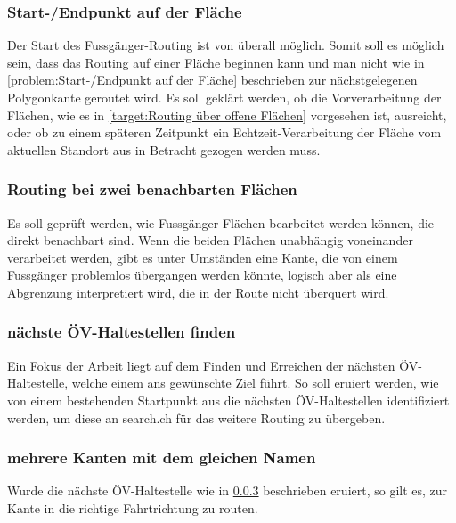 \subsubsection{Start-/Endpunkt auf der Fläche}
\label{target:Start-/Endpunkt auf der Fläche}
Der Start des Fussgänger-Routing ist von überall möglich. Somit soll es möglich sein, dass das Routing auf einer Fläche beginnen kann und man nicht wie in \ref{problem:Start-/Endpunkt auf der Fläche} beschrieben zur nächstgelegenen Polygonkante geroutet wird. Es soll geklärt werden, ob die Vorverarbeitung der Flächen, wie es in \ref{target:Routing über offene Flächen} vorgesehen ist, ausreicht, oder ob zu einem späteren Zeitpunkt ein Echtzeit-Verarbeitung der Fläche vom aktuellen Standort aus in Betracht gezogen werden muss.

\subsubsection{Routing bei zwei benachbarten Flächen}
\label{target:Routing bei zwei benachbarten Flächen}

Es soll geprüft werden, wie Fussgänger-Flächen bearbeitet werden können, die direkt benachbart sind. Wenn die beiden Flächen unabhängig voneinander verarbeitet werden, gibt es unter Umständen eine Kante, die von einem Fussgänger problemlos übergangen werden könnte, logisch aber als eine Abgrenzung interpretiert wird, die in der Route nicht überquert wird.

\subsubsection{nächste ÖV-Haltestellen finden}
\label{target:nächste ÖV-Haltestellen finden}
Ein Fokus der Arbeit liegt auf dem Finden und Erreichen der nächsten ÖV-Haltestelle, welche einem ans gewünschte Ziel führt. So soll eruiert werden, wie von einem bestehenden Startpunkt aus die nächsten ÖV-Haltestellen identifiziert werden, um diese an search.ch für das weitere Routing zu übergeben.

\subsubsection{mehrere Kanten mit dem gleichen Namen}
\label{target:mehrere Kanten mit dem gleichen Namen}
Wurde die nächste ÖV-Haltestelle wie in \ref{target:nächste ÖV-Haltestellen finden} beschrieben eruiert, so gilt es, zur \gls{Kante} in die richtige Fahrtrichtung zu routen.

